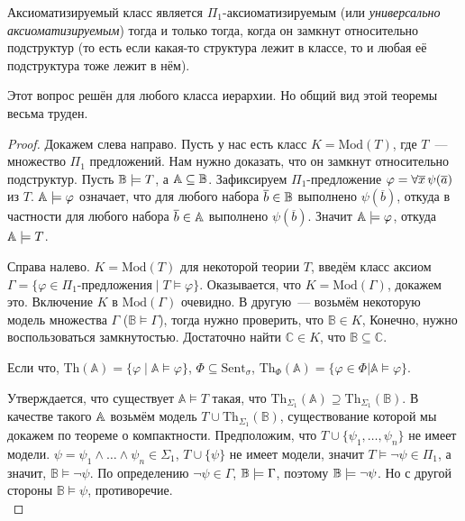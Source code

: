 \begin{theorem}
    Аксиоматизируемый класс является $\Pi_1$-аксиоматизируемым (или \emph{универсально аксиоматизируемым}) тогда и только тогда, когда он замкнут относительно подструктур (то есть если какая-то структура лежит в классе, то и любая её подструктура тоже лежит в нём).
\end{theorem}
\begin{remark}
    Этот вопрос решён для любого класса иерархии. Но общий вид этой теоремы весьма труден.
\end{remark}
\begin{proof}
    Докажем слева направо. Пусть у нас есть класс $K = \text{Mod}(T)$, где $T$~— множество $\Pi_1$ предложений. Нам нужно доказать, что он замкнут относительно подструктур.
    Пусть ${\mathbb B}\models T$, а ${\mathbb A}\subseteq{\mathbb B}$. Зафиксируем $\Pi_1$-предложение $\varphi=\forall\overline{x}\,\psi(\overline{a})$ из $T$. ${\mathbb A}\models\varphi$ означает, что для любого набора $\overline{b}\in{\mathbb B}$ выполнено $\psi(\overline{b})$, откуда в частности для любого набора $\overline{b}\in{\mathbb A}$ выполнено $\psi(\overline{b})$. Значит ${\mathbb A}\models\varphi$, откуда ${\mathbb A}\models T$.


    Справа налево. $K = \text{Mod}(T)$ для некоторой теории $T$, введём класс аксиом $\Gamma = \{\varphi \in \Pi_1\text{-предложения} \mid T \models \varphi\}$. Оказывается, что $K = \text{Mod}(\Gamma)$, докажем это. Включение $K$ в $\text{Mod}(\Gamma)$ очевидно. В другую~— возьмём некоторую модель множества $\Gamma$ ($\mathbb{B} \models \Gamma$), тогда нужно проверить, что $\mathbb{B} \in K$, Конечно, нужно воспользоваться замкнутостью. Достаточно найти $\mathbb{C} \in K$, что $\mathbb{B} \subseteq \mathbb{C}$. 

    \begin{definition}
        Если что, $\text{Th}(\mathbb{A}) = \{\varphi \mid \mathbb{A} \models \varphi\}$, $\Phi \subseteq \text{Sent}_\sigma$, $\text{Th}_{\Phi}(\mathbb{A}) = \{\varphi \in \Phi | \mathbb{A} \models \varphi\}$.
    \end{definition}
    Утверждается, что существует $\mathbb{A} \models T$ такая, что $\text{Th}_{\Sigma_1}(\mathbb{A}) \supseteq \text{Th}_{\Sigma_1}(\mathbb{B})$.
    В качестве такого ${\mathbb A}$ возьмём модель $T \cup \text{Th}_{\Sigma_1}(\mathbb{B})$, существование которой мы докажем по теореме о компактности.
    Предположим, что $T \cup \{\psi_1, \ldots, \psi_n\}$ не имеет модели. $\psi = \psi_1 \wedge \ldots \wedge \psi_n \in \Sigma_1$, $T \cup \{\psi\}$ не имеет модели, значит $T \models \neg \psi \in \Pi_1$, а значит, $\mathbb{B} \models \neg \psi$. По определению $\neg\psi\in\Gamma$, ${\mathbb B}\models\Gamma$, поэтому ${\mathbb B}\models\neg\psi$. Но с другой стороны $\mathbb{B} \models \psi$, противоречие. \\ 


\end{proof}
